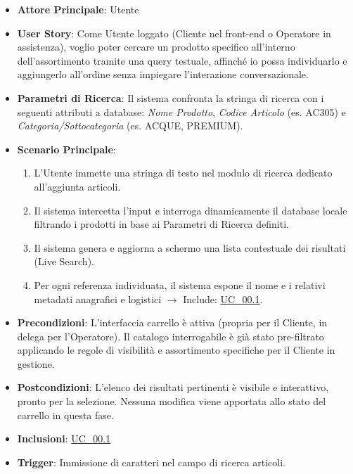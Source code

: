 \begin{itemize}
    \item \textbf{Attore Principale}: Utente
    \item \textbf{User Story}: Come Utente loggato (Cliente nel front-end o Operatore in assistenza), voglio poter cercare un prodotto specifico all'interno dell'assortimento tramite una query testuale, affinché io possa individuarlo e aggiungerlo all'ordine senza impiegare l'interazione conversazionale.
    \item \textbf{Parametri di Ricerca}: Il sistema confronta la stringa di ricerca con i seguenti attributi a database: \textit{Nome Prodotto}, \textit{Codice Articolo} (es. AC305) e \textit{Categoria/Sottocategoria} (es. ACQUE, PREMIUM).
    \item \textbf{Scenario Principale}: 
    \begin{enumerate}
        \item L'Utente immette una stringa di testo nel modulo di ricerca dedicato all'aggiunta articoli.
        \item Il sistema intercetta l'input e interroga dinamicamente il database locale filtrando i prodotti in base ai Parametri di Ricerca definiti.
        \item Il sistema genera e aggiorna a schermo una lista contestuale dei risultati (Live Search).
        \item Per ogni referenza individuata, il sistema espone il nome e i relativi metadati anagrafici e logistici $\rightarrow$ Include: \hyperref[uc_00.1]{UC\_00.1}.
    \end{enumerate}
    \item \textbf{Precondizioni}: L'interfaccia carrello è attiva (propria per il Cliente, in delega per l'Operatore). Il catalogo interrogabile è già stato pre-filtrato applicando le regole di visibilità e assortimento specifiche per il Cliente in gestione.
    \item \textbf{Postcondizioni}: L'elenco dei risultati pertinenti è visibile e interattivo, pronto per la selezione. Nessuna modifica viene apportata allo stato del carrello in questa fase.
    \item \textbf{Inclusioni}: \hyperref[uc_00.1]{UC\_00.1}
    \item \textbf{Trigger}: Immissione di caratteri nel campo di ricerca articoli.
\end{itemize}


